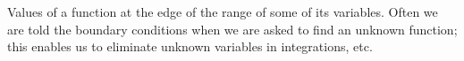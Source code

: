 Values of a function at the edge of the range of some of its
variables. Often we are told the boundary conditions
when we are asked to find an unknown function; this enables
us to eliminate unknown variables in integrations, etc.